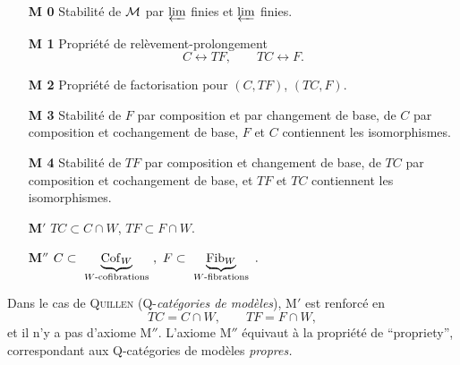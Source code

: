 \begin{itemize}[leftmargin=3em,labelsep=0.6em]
\item[\textbf{M 0}] Stabilité de $\mathcal{M}$ par $\varprojlim$ finies et $\varprojlim$ finies.

\item[\textbf{M 1}]Propriété de relèvement-prolongement
\[
C\longleftrightarrow TF,\qquad TC\longleftrightarrow F.
\]

\item[\textbf{M 2}] Propriété de factorisation pour $(C,TF)$, $(TC,F)$.

\item[\textbf{M 3}] Stabilité de $F$ par composition et par changement de base, de $C$ par composition et cochangement de base, $F$ et $C$ contiennent les isomorphismes.

\item[\textbf{M 4}] Stabilité de $TF$ par composition et changement de base, de $TC$ par composition et cochangement de base, et $TF$ et $TC$ contiennent les isomorphismes.

\item[\textbf{M}$'$] $TC\subset C\cap W$, $TF\subset F\cap W$.

\item[\textbf{M}$''$] $C\subset\ \underbrace{\Cof_W}_{\text{$W$-cofibrations}}\ ,\ F\subset\ \underbrace{\Fib_W}_{\text{$W$-fibrations}}\ .$
\end{itemize}



Dans le cas de \textsc{Quillen} (Q-\textit{catégories de modèles}), M$'$ est renforcé en
\[
TC=C\cap W,\qquad TF=F\cap W,
\]
et il n'y a pas d'axiome M$''$. L'axiome M$''$ équivaut à la propriété de “propriety”, correspondant aux Q-catégories de modèles \textit{propres.}

